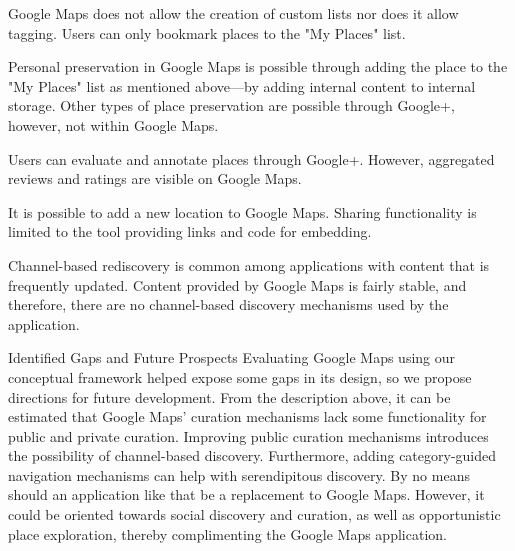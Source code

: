 {Google Maps does not allow the creation of custom lists nor does it allow tagging. Users can only bookmark places to the "My Places" list. 

Personal preservation in Google Maps is possible through adding the place to the "My Places" list as mentioned above---by adding internal content to internal storage. Other types of place preservation are possible through Google+, however, not within Google Maps.

Users can evaluate and annotate places through Google+. However, aggregated reviews and ratings are visible on Google Maps. 

It is possible to add a new location to Google Maps. Sharing functionality is limited to the tool providing links and code for embedding.  

Channel-based rediscovery is common among applications with content that is frequently updated. Content provided by Google Maps is fairly stable, and therefore, there are no channel-based discovery mechanisms used by the application.

Identified Gaps and Future Prospects
Evaluating Google Maps using our conceptual framework helped expose some gaps in its design, so we propose directions for future development. From the description above, it can be estimated that Google Maps' curation mechanisms lack some functionality for public and private curation. Improving public curation mechanisms introduces the possibility of channel-based discovery. Furthermore, adding category-guided navigation mechanisms can help with serendipitous discovery. By no means should an application like that be a replacement to Google Maps. However, it could be oriented towards social discovery and curation, as well as opportunistic place exploration, thereby complimenting the Google Maps application.  

} %

